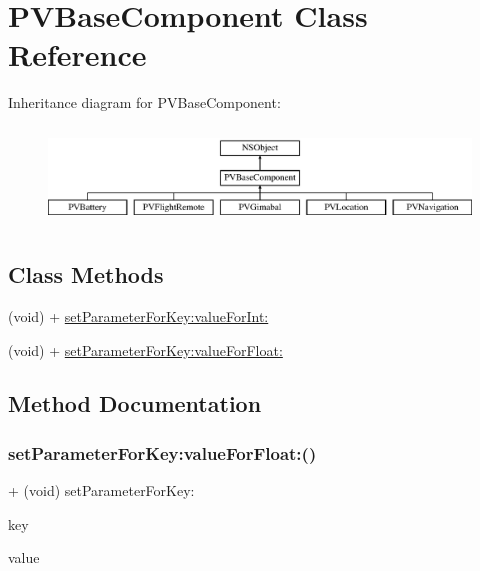 \hypertarget{interface_p_v_base_component}{}\section{P\+V\+Base\+Component Class Reference}
\label{interface_p_v_base_component}
Inheritance diagram for P\+V\+Base\+Component\+:\begin{figure}[H]
\begin{center}
\leavevmode
\includegraphics[height=2.625000cm]{interface_p_v_base_component}
\end{center}
\end{figure}
\subsection*{Class Methods}
\begin{DoxyCompactItemize}
\item 
(void) + \hyperlink{interface_p_v_base_component_a8823275eace0c9358aaf7c0ba7d8cffe}{set\+Parameter\+For\+Key\+:value\+For\+Int\+:}
\item 
(void) + \hyperlink{interface_p_v_base_component_a0be538c6f769172259ddbd2c3106469e}{set\+Parameter\+For\+Key\+:value\+For\+Float\+:}
\end{DoxyCompactItemize}


\subsection{Method Documentation}
\mbox{\label{interface_p_v_base_component_a0be538c6f769172259ddbd2c3106469e}} 
\subsubsection{\texorpdfstring{set\+Parameter\+For\+Key\+:value\+For\+Float\+:()}{setParameterForKey:valueForFloat:()}}
{\footnotesize\ttfamily + (void) set\+Parameter\+For\+Key\+: \begin{DoxyParamCaption}\item[{(N\+S\+String $\ast$\+\_\+\+Nonnull)}]{key }\item[{valueForFloat:(float)}]{value }\end{DoxyParamCaption}}

